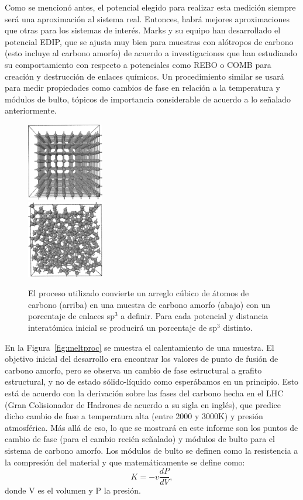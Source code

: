 \documentclass[aps,prl,twocolumn,superscriptaddress,groupedaddress]{revtex4}
\begin{document}
Como se mencionó antes, el potencial elegido para realizar esta medición siempre será una aproximación al sistema real. Entonces, habrá mejores aproximaciones que otras para los sistemas de interés. Marks y su equipo han desarrollado el potencial EDIP, que se ajusta muy bien para muestras con alótropos de carbono (esto incluye al carbono amorfo) de acuerdo a investigaciones que han estudiando su comportamiento con respecto a potenciales como REBO o COMB para creación y destrucción de enlaces químicos\cite{ACPot2}. Un procedimiento similar se usará para medir propiedades como cambios de fase en relación a la temperatura y módulos de bulto, tópicos de importancia considerable de acuerdo a lo señalado anteriormente.

    \begin{figure}
        \includegraphics[width=0.3\textwidth]{carbon1.png}\\
        \includegraphics[width=0.3\textwidth]{carbon2.png}
    \label{fig:carbon}
    \caption{El proceso utilizado convierte un arreglo cúbico de átomos de carbono (arriba) en una muestra de carbono amorfo (abajo) con un porcentaje de enlaces sp$^3$ a definir. Para cada potencial y distancia interatómica inicial se producirá un porcentaje de sp$^3$ distinto. }
   \end{figure}

 En la Figura~\ref{fig:meltproc} se muestra el calentamiento de una muestra. El objetivo inicial del desarrollo era encontrar los valores de punto de fusión de carbono amorfo, pero se observa un cambio de fase estructural a grafito estructural, y no de estado sólido-líquido como esperábamos en un principio. Esto está de acuerdo con la derivación sobre las fases del carbono hecha en el LHC (Gran Colisionador de Hadrones de acuerdo a su sigla en inglés), que predice dicho cambio de fase a temperatura alta (entre 2000 y 3000K) y presión atmosférica.\cite{Zazula}  Más allá de eso, lo que se mostrará en este informe son los puntos de cambio de fase (para el cambio recién señalado) y módulos de bulto para el sistema de carbono amorfo. Los módulos de bulto se definen como la resistencia a la compresión del material y que matemáticamente se define como:
 \begin{equation} K=-v\frac{dP}{dV}, \end{equation} donde V es el volumen y P la presión. 
 
\end{document}
